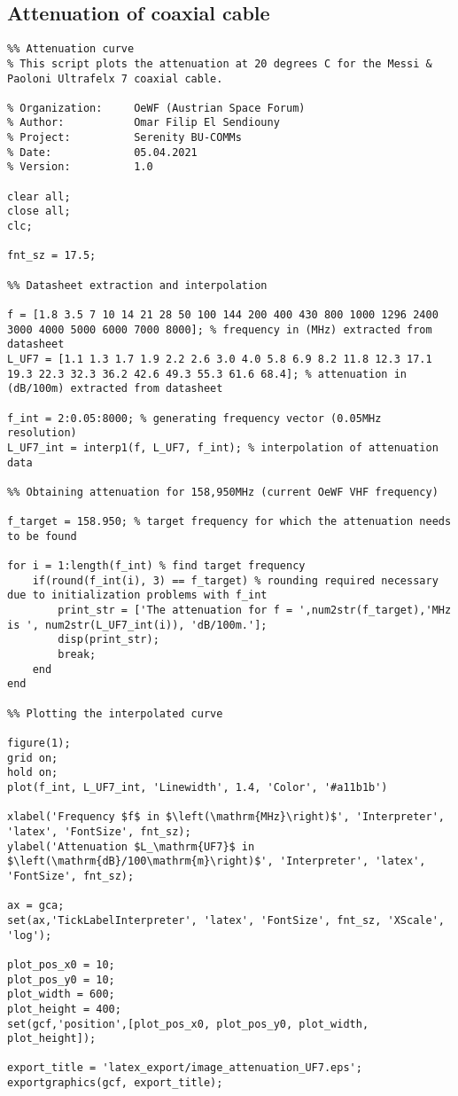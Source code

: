 \subsection{Attenuation of coaxial cable} \label{sec:att}
\begin{lstlisting}
%% Attenuation curve
% This script plots the attenuation at 20 degrees C for the Messi & Paoloni Ultrafelx 7 coaxial cable. 

% Organization:     OeWF (Austrian Space Forum)
% Author:           Omar Filip El Sendiouny
% Project:          Serenity BU-COMMs
% Date:             05.04.2021
% Version:          1.0

clear all;
close all;
clc;

fnt_sz = 17.5;

%% Datasheet extraction and interpolation

f = [1.8 3.5 7 10 14 21 28 50 100 144 200 400 430 800 1000 1296 2400 3000 4000 5000 6000 7000 8000]; % frequency in (MHz) extracted from datasheet
L_UF7 = [1.1 1.3 1.7 1.9 2.2 2.6 3.0 4.0 5.8 6.9 8.2 11.8 12.3 17.1 19.3 22.3 32.3 36.2 42.6 49.3 55.3 61.6 68.4]; % attenuation in (dB/100m) extracted from datasheet

f_int = 2:0.05:8000; % generating frequency vector (0.05MHz resolution)
L_UF7_int = interp1(f, L_UF7, f_int); % interpolation of attenuation data

%% Obtaining attenuation for 158,950MHz (current OeWF VHF frequency)

f_target = 158.950; % target frequency for which the attenuation needs to be found

for i = 1:length(f_int) % find target frequency
    if(round(f_int(i), 3) == f_target) % rounding required necessary due to initialization problems with f_int
        print_str = ['The attenuation for f = ',num2str(f_target),'MHz is ', num2str(L_UF7_int(i)), 'dB/100m.'];
        disp(print_str);
        break;
    end
end

%% Plotting the interpolated curve

figure(1);
grid on;
hold on;
plot(f_int, L_UF7_int, 'Linewidth', 1.4, 'Color', '#a11b1b')

xlabel('Frequency $f$ in $\left(\mathrm{MHz}\right)$', 'Interpreter', 'latex', 'FontSize', fnt_sz);
ylabel('Attenuation $L_\mathrm{UF7}$ in $\left(\mathrm{dB}/100\mathrm{m}\right)$', 'Interpreter', 'latex', 'FontSize', fnt_sz);

ax = gca;
set(ax,'TickLabelInterpreter', 'latex', 'FontSize', fnt_sz, 'XScale', 'log');

plot_pos_x0 = 10;
plot_pos_y0 = 10;
plot_width = 600;
plot_height = 400;
set(gcf,'position',[plot_pos_x0, plot_pos_y0, plot_width, plot_height]);

export_title = 'latex_export/image_attenuation_UF7.eps';
exportgraphics(gcf, export_title);
\end{lstlisting}